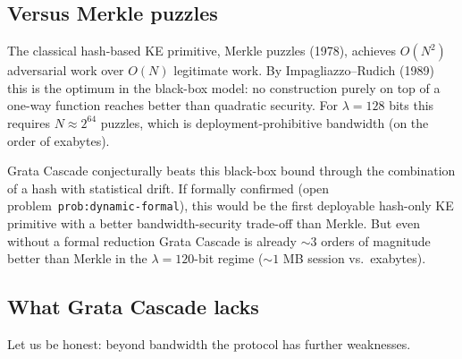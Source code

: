 \documentclass[11pt,a4paper]{article}
\begin{document}
\subsection{Versus Merkle puzzles}

The classical hash-based KE primitive, Merkle puzzles (1978), achieves $O(N^2)$ adversarial work over $O(N)$ legitimate work. By Impagliazzo--Rudich (1989) this is the optimum in the black-box model: no construction purely on top of a one-way function reaches better than quadratic security. For $\lambda = 128$ bits this requires $N \approx 2^{64}$ puzzles, which is deployment-prohibitive bandwidth (on the order of exabytes).

Grata Cascade conjecturally beats this black-box bound through the combination of a hash with statistical drift. If formally confirmed (open problem~\texttt{prob:dynamic-formal}), this would be the first deployable hash-only KE primitive with a better bandwidth-security trade-off than Merkle. But even without a formal reduction Grata Cascade is already $\sim 3$ orders of magnitude better than Merkle in the $\lambda = 120$-bit regime ($\sim 1$ MB session vs.\ exabytes).

\subsection{What Grata Cascade lacks}

Let us be honest: beyond bandwidth the protocol has further weaknesses.
\end{document}
